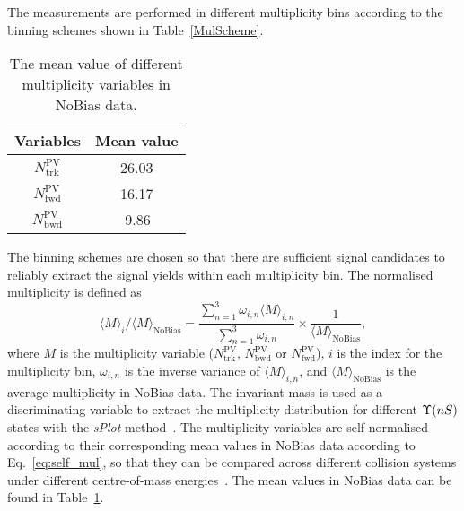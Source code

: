 \documentclass[12pt,a4paper]{article}
\def\pvt{N_{\mathrm{trk}}^{\mathrm{PV}}}
\def\bkt{N_{\mathrm{bwd}}^{\mathrm{PV}}}
\def\fwt{N_{\mathrm{fwd}}^{\mathrm{PV}}}
\def\sPlot{\mbox{\em sPlot}\xspace}
\begin{document}
The measurements are performed in different multiplicity bins according to the binning schemes shown in Table~\ref{MulScheme}. 
\begin{table}[t]
    \centering
    \renewcommand*{\arraystretch}{1.1}
    \caption{The mean value of different multiplicity variables in NoBias data.}
\begin{tabular}{cc}
\hline
    Variables & Mean value \\
    \hline
        $\pvt$ & 26.03  \\
$\fwt$& 16.17 \\
$\bkt$& \;\,9.86 \\
    \hline
    \end{tabular}
   \label{MulNobias}
\end{table} 
The binning schemes are chosen so that there are sufficient signal candidates to reliably extract the signal yields within each multiplicity bin.
The normalised multiplicity is defined as
\begin{equation}
\label{eq:self_mul}
   \langle M \rangle_{i} / \langle M \rangle_\text{NoBias}
 = \frac{\sum_{n=1}^{3} \omega_{i,n}\langle M\rangle_{i,n}}{\sum_{n=1}^{3} \omega_{i,n}} \times \frac{1}{\langle M \rangle_\text{NoBias}},
\end{equation}
where $M$ is the multiplicity variable ($\pvt$, $\bkt$ or $\fwt$), $i$ is the index for the multiplicity bin, $\omega_{i,n}$ is the inverse variance of $\langle M \rangle_{i,n}$, and $\langle M \rangle_\text{NoBias}$ is the average multiplicity in \mbox{NoBias} data. The invariant mass is used as a discriminating variable to extract the multiplicity distribution for different $\Upsilon{(nS)}$ states with the \sPlot method~\cite{Pivk:2004ty}.
The multiplicity variables are self-normalised according to their corresponding mean values in \mbox{NoBias} data according to Eq.~\ref{eq:self_mul}, so that they can be compared across different collision systems under different centre-of-mass energies~\cite{KOBA1972317}. 
The mean values in \mbox{NoBias} data can be found in Table~\ref{MulNobias}.
\end{document}
